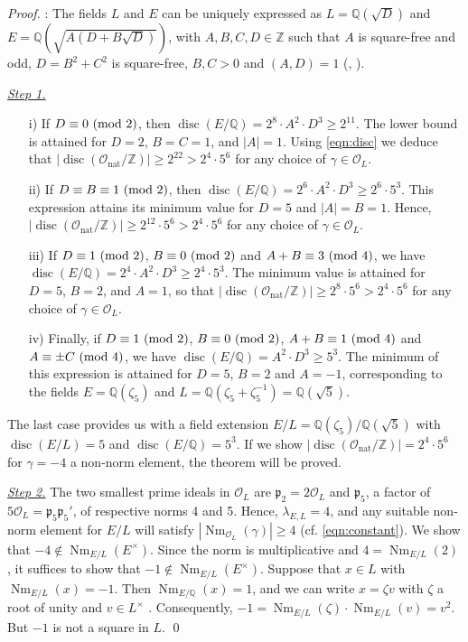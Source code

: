\documentclass[smallextended]{svjour3}
\def\zmod#1{\,\,({\rm mod}\,\,#1)}
\newcommand{\Q}{\mathbb{Q}}
\newcommand{\Z}{\mathbb{Z}}
\newcommand{\Or}{\mathcal{O}}
\DeclareMathOperator{\Nm}{Nm}
\DeclareMathOperator{\nat}{nat}
\DeclareMathOperator{\disc}{disc}
\begin{document}
\begin{proof}:
The fields $L$ and $E$ can be uniquely expressed as $L = \Q(\sqrt{D})$ and $E = \Q\left(\sqrt{A(D+B\sqrt D)}\right )$, with $A,B,C,D \in \Z$ such that $A$ is square-free and odd, $D = B^2+C^2$ is square-free, $B,C > 0$ and $(A,D) = 1$ (\cite{HW}, \cite{HSW}).
\medskip

\noindent\emph{\underline{Step 1.}}  

\begin{itemize}

	\item[i)]If $D \equiv 0 \zmod 2$, then $\disc(E/\Q) = 2^8\cdot A^2\cdot D^3 \ge 2^{11}$. The lower bound is attained for $D = 2$, $B = C = 1$, and $|A| = 1$. Using \eqref{eqn:disc} we deduce that $|\disc(\Or_{\nat}/\Z)| \ge 2^{22} > 2^4\cdot 5^6$ for any choice of $\gamma \in \Or_L$.

	\item[ii)] If $D \equiv B\equiv 1 \zmod 2$, then $\disc(E/\Q) = 2^6\cdot A^2 \cdot D^3 \ge 2^6\cdot 5^3$. This expression attains its minimum value for $D = 5$ and $|A| = B = 1$.  Hence, $|\disc(\Or_{\nat}/\Z)| \ge 2^{12}\cdot 5^6 > 2^4\cdot 5^6$ for any choice of $\gamma \in \Or_L$.

	\item[iii)] If $D\equiv 1 \zmod 2$, $B\equiv 0 \zmod 2$ and $A+B\equiv 3 \zmod 4$, we have $\disc(E/\Q)=2^4 \cdot A^2 \cdot D^3 \ge 2^4\cdot 5^3$. 
The minimum value is attained for $D = 5$, $B = 2$, and $A = 1$, so that
$|\disc(\Or_{\nat}/\Z)| \ge 2^8\cdot 5^6> 2^4\cdot 5^6$ for any choice of $\gamma \in \Or_L$.

	\item[iv)]  Finally, if $D\equiv 1 \zmod 2$, $B\equiv 0 \zmod 2$, $A+B\equiv 1 \zmod 4$ and $A\equiv \pm C \zmod 4$, we have $\disc(E/\Q) = A^2 \cdot D^3 \ge 5^3$. The minimum of this expression is attained for $D = 5$, $B = 2$ and $A = -1$, corresponding to the fields $E = \Q(\zeta_5)$ and $L = \Q(\zeta_5+\zeta_5^{-1}) = \Q(\sqrt 5)$. 
\end{itemize}

The last case provides us with a field extension $E/L = \Q(\zeta_5)/\Q(\sqrt 5)$ with $\disc(E/L) = 5$ and $\disc(E/\Q) = 5^3$. If we show $|\disc(\Or_{\nat}/\Z)| = 2^4\cdot 5^6$ for $\gamma = -4$ a non-norm element, the theorem will be proved.
\medskip

\noindent\emph{\underline{Step 2.}}  
The two smallest prime ideals in $\Or_L$ are $\mathfrak p_2 = 2\Or_L$ and $\mathfrak p_5$, a factor of $5\Or_L = \mathfrak p_5 \mathfrak p_5'$, of respective norms 4 and 5. Hence, $\lambda_{E,L} = 4$, and any suitable non-norm element for $E/L$ will satisfy $|\Nm_{\Or_L}(\gamma)|\ge 4$ (cf. \eqref{eqn:constant}). We show that $-4 \not \in \Nm_{E/L}(E^\times)$. Since the norm is multiplicative and $4 = \Nm_{E/L}(2)$, it suffices to show that $-1 \notin \Nm_{E/L}(E^\times)$. Suppose that $x\in L$ with $\Nm_{E/L}(x) = -1$. Then $\Nm_{E/\Q}(x) = 1$, and we can write $x = \zeta v$ with $\zeta$ a root of unity and $v \in L^\times$ \cite[Prop.~6.7]{JM}. Consequently, $-1 = \Nm_{E/L}(\zeta)\cdot\Nm_{E/L}(v) = v^2$. But $-1$ is not a square in $L$. \qed
\end{proof}
\end{document}
